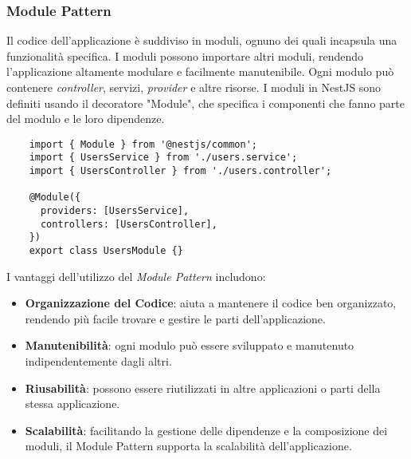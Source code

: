 \subsubsection{Module Pattern}
Il codice dell'applicazione è suddiviso in moduli, ognuno dei quali incapsula una funzionalità specifica. 
I moduli possono importare altri moduli, rendendo l'applicazione altamente modulare e facilmente manutenibile.
Ogni modulo può contenere \textit{controller}, servizi, \textit{provider} e altre risorse.
I moduli in NestJS sono definiti usando il decoratore "Module", che specifica i componenti che fanno parte del modulo e le loro dipendenze.
\begin{lstlisting}
	import { Module } from '@nestjs/common';
	import { UsersService } from './users.service';
	import { UsersController } from './users.controller';
	
	@Module({
	  providers: [UsersService],
	  controllers: [UsersController],
	})
	export class UsersModule {}
\end{lstlisting}
I vantaggi dell'utilizzo del \textit{Module Pattern} includono:
\begin{itemize}
	\item \textbf{Organizzazione del Codice}: aiuta a mantenere il codice ben organizzato, rendendo più facile trovare e gestire le parti dell'applicazione.
	\item \textbf{Manutenibilità}: ogni modulo può essere sviluppato e manutenuto indipendentemente dagli altri.
	\item \textbf{Riusabilità}: possono essere riutilizzati in altre applicazioni o parti della stessa applicazione.
	\item \textbf{Scalabilità}: facilitando la gestione delle dipendenze e la composizione dei moduli, il Module Pattern supporta la scalabilità dell'applicazione.
\end{itemize}


